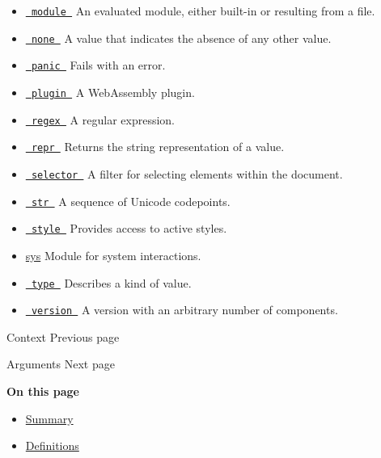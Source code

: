 \begin{itemize}
{  label for an element. }
\item
  \href{/docs/reference/foundations/module/}{\texttt{\ module\ }} { An
  evaluated module, either built-in or resulting from a file. }
\item
  \href{/docs/reference/foundations/none/}{\texttt{\ none\ }} { A value
  that indicates the absence of any other value. }
\item
  \href{/docs/reference/foundations/panic/}{\texttt{\ panic\ }} { Fails
  with an error. }
\item
  \href{/docs/reference/foundations/plugin/}{\texttt{\ plugin\ }} { A
  WebAssembly plugin. }
\item
  \href{/docs/reference/foundations/regex/}{\texttt{\ regex\ }} { A
  regular expression. }
\item
  \href{/docs/reference/foundations/repr/}{\texttt{\ repr\ }} { Returns
  the string representation of a value. }
\item
  \href{/docs/reference/foundations/selector/}{\texttt{\ selector\ }} {
  A filter for selecting elements within the document. }
\item
  \href{/docs/reference/foundations/str/}{\texttt{\ str\ }} { A sequence
  of Unicode codepoints. }
\item
  \href{/docs/reference/foundations/style/}{\texttt{\ style\ }} {
  Provides access to active styles. }
\item
  \href{/docs/reference/foundations/sys}{sys} { Module for system
  interactions. }
\item
  \href{/docs/reference/foundations/type/}{\texttt{\ type\ }} {
  Describes a kind of value. }
\item
  \href{/docs/reference/foundations/version/}{\texttt{\ version\ }} { A
  version with an arbitrary number of components. }
\end{itemize}

\href{/docs/reference/context/}{\pandocbounded{}}

{ Context } { Previous page }

\href{/docs/reference/foundations/arguments/}{\pandocbounded{}}

{ Arguments } { Next page }

\textbf{On this page}

\begin{itemize}
\tightlist
\item
  \hyperref[summary]{Summary}
\item
  \hyperref[definitions]{Definitions}
\end{itemize}


